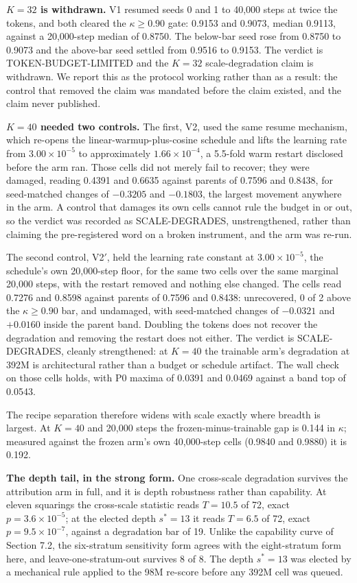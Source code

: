 \textbf{$K{=}32$ is withdrawn.} V1 resumed seeds 0 and 1 to 40,000 steps at
twice the tokens, and both cleared the $\kappa \geq 0.90$ gate: 0.9153
and 0.9073, median 0.9113, against a 20,000-step median of 0.8750. The
below-bar seed rose from 0.8750 to 0.9073 and the above-bar seed settled
from 0.9516 to 0.9153. The verdict is TOKEN-BUDGET-LIMITED and the
$K{=}32$ scale-degradation claim is withdrawn. We report this as the
protocol working rather than as a result: the control that removed the
claim was mandated before the claim existed, and the claim never
published.

\textbf{$K{=}40$ needed two controls.} The first, V2, used the same resume
mechanism, which re-opens the linear-warmup-plus-cosine schedule and
lifts the learning rate from $3.00 \times 10^{-5}$ to approximately
$1.66 \times 10^{-4}$, a 5.5-fold warm restart disclosed before the arm
ran. Those cells did not merely fail to recover; they were damaged,
reading 0.4391 and 0.6635 against parents of 0.7596 and 0.8438, for
seed-matched changes of $-0.3205$ and $-0.1803$, the largest movement
anywhere in the arm. A control that damages its own cells cannot rule
the budget in or out, so the verdict was recorded as SCALE-DEGRADES,
unstrengthened, rather than claiming the pre-registered word on a broken
instrument, and the arm was re-run.

The second control, V2$'$, held the learning rate constant at
$3.00 \times 10^{-5}$, the schedule's own 20,000-step floor, for the
same two cells over the same marginal 20,000 steps, with the restart
removed and nothing else changed. The cells read 0.7276 and 0.8598
against parents of 0.7596 and 0.8438: unrecovered, 0 of 2 above the
$\kappa \geq 0.90$ bar, and undamaged, with seed-matched changes of
$-0.0321$ and $+0.0160$ inside the parent band. Doubling the tokens does
not recover the degradation and removing the restart does not either.
The verdict is SCALE-DEGRADES, cleanly strengthened: at $K{=}40$ the
trainable arm's degradation at 392M is architectural rather than a
budget or schedule artifact. The wall check on those cells holds, with
P0 maxima of 0.0391 and 0.0469 against a band top of 0.0543.

The recipe separation therefore widens with scale exactly where breadth
is largest. At $K{=}40$ and 20,000 steps the frozen-minus-trainable gap
is 0.144 in $\kappa$; measured against the frozen arm's own 40,000-step
cells (0.9840 and 0.9880) it is 0.192.

\textbf{The depth tail, in the strong form.} One cross-scale degradation
survives the attribution arm in full, and it is depth robustness rather
than capability. At eleven squarings the cross-scale statistic reads
$T = 10.5$ of 72, exact $p = 3.6 \times 10^{-5}$; at the elected depth
$s^{*}{=}13$ it reads $T = 6.5$ of 72, exact
$p = 9.5 \times 10^{-7}$, against a degradation bar of 19. Unlike the
capability curve of Section 7.2, the six-stratum sensitivity form agrees
with the eight-stratum form here, and leave-one-stratum-out survives 8
of 8. The depth $s^{*}{=}13$ was elected by a mechanical rule applied to
the 98M re-score before any 392M cell was queued.

